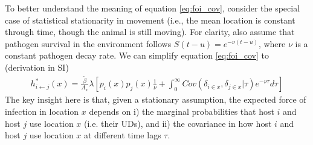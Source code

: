 \documentclass[letterpaper]{article}
\begin{document}


To better understand the meaning of equation \ref{eq:foi_cov}, consider the special case of statistical stationarity in movement (i.e., the mean location is constant through time, though the animal is still moving).  
For clarity, also assume that pathogen survival in the environment follows $S(t - u) = e^{-\nu (t - u)}$, where $\nu$ is a constant pathogen decay rate.  We  can simplify equation \ref{eq:foi_cov} to (derivation in SI)
\begin{equation}
    \begin{aligned}
   h^*_{i \leftarrow j}(x) = \frac{\tilde{\beta}}{A_x} \lambda \left[p_i(x)p_j(x) \frac{1}{\nu} + \int_{0}^{\infty} Cov(\delta_{i \in x}, \delta_{j \in x} | \tau) e^{-\nu \tau} d\tau\right]
    \end{aligned}
    \label{eq:foi_stationary}
\end{equation}
The key insight here is that, given a stationary assumption, the expected force of infection in location $x$ depends on i) the marginal probabilities that host $i$ and host $j$ use location $x$ (i.e. their UDs), 
and ii) the covariance in how host $i$ and host $j$ use location $x$ at different time lags $\tau$. 

\end{document}
